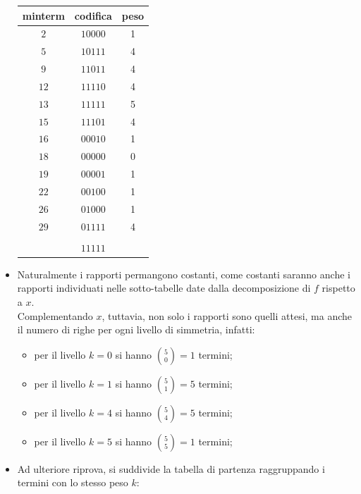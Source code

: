 \documentclass[a4paper]{extarticle}
\renewcommand\arraystretch{}
\begin{document}
\begin{itemize}
    \noindent
    \begin{table}[H]
    \setlength{\tabcolsep}{4pt}
    \renewcommand{\arraystretch}{1}
    \centering
    \begin{tabular}{|c|c|c|}
        minterm & codifica & peso\\
        \hline
        $2$ & $10000$ & 1\\
        $5$ & $10111$ & 4\\
        $9$ & $11011$ & 4\\
        $12$ & $11110$ & 4\\
        $13$ & $11111$ & 5\\
        $15$ & $11101$ & 4\\
        $16$ & $00010$ & 1\\
        $18$ & $00000$ & 0\\
        $19$ & $00001$ & 1\\
        $22$ & $00100$ & 1\\
        $26$ & $01000$ & 1\\
        $29$ & $01111$ & 4\\
        \hline
         & & \\
         & $11111$ & \\
    \end{tabular}
    \end{table}

    \item Naturalmente i rapporti permangono costanti, come costanti saranno anche i rapporti individuati nelle sotto-tabelle date dalla decomposizione di $f$ rispetto a $x$.\\
    Complementando $x$, tuttavia, non solo i rapporti sono quelli attesi, ma anche il numero di righe per ogni livello di simmetria, infatti:
    \begin{itemize}
        \item per il livello $k=0$ si hanno $\displaystyle{\binom{5}{0}}=1$ termini;
        \item per il livello $k=1$ si hanno $\displaystyle{\binom{5}{1}}=5$ termini;
        \item per il livello $k=4$ si hanno $\displaystyle{\binom{5}{4}}=5$ termini;
        \item per il livello $k=5$ si hanno $\displaystyle{\binom{5}{5}}=1$ termini;
    \end{itemize}

    \item Ad ulteriore riprova, si suddivide la tabella di partenza raggruppando i termini con lo stesso peso $k$:


\end{itemize}
\end{document}
